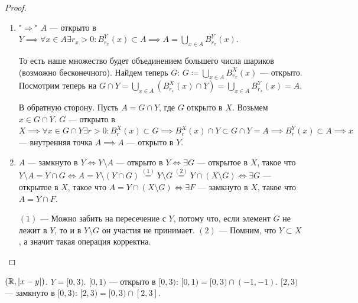 \begin{proof}
     \slashn
     \begin{enumerate}
         \item "$\Rightarrow$" $A$ --- открыто в  $Y \implies \forall x \in A \exists r_x > 0 \!: B_{r_x}^Y(x) \subset A \implies A = \bigcup\limits_{x \in A}B_{r_x}^Y(x)$.

             То есть наше множество будет объединением большего числа шариков (возможно бесконечного). Найдем теперь  $G$:  $G \coloneqq \bigcup\limits_{x \in A} B_{r_x}^X(x)$ --- открыто. Посмотрим теперь на  $G \cap Y = \bigcup\limits_{x \in A}(B_{r_x}^X(x) \cap Y) = \bigcup\limits_{x \in A}B_{r_x}^Y(x) = A$.

         В обратную сторону. Пусть $A = G \cap Y$, где  $G$ открыто в  $X$. Возьмем  $x \in G \cap Y$.  $G$ --- открыто в  $X \implies \forall x \in G \cap Y \exists r > 0\!: B_r^X(x) \subset G \implies B_r^X(x) \cap Y \subset G \cap Y = A \implies B_r^Y(x) \subset A \implies x$ --- внутренняя точка $A \implies A$ --- открыто в  $Y$. 

         \item $A$ --- замкнуто в $Y \iff Y \setminus A$ --- открыто в  $Y \iff \exists G$ --- открытое в  $X$, такое что  $Y \setminus A = Y \cap G \iff A = Y \setminus (Y \cap G) \overset{(1)}{=} Y \setminus G \overset{(2)}{=} Y \cap (X \setminus G) \iff \exists G$ --- открытое в  $X$, такое что  $A = Y \cap (X \setminus G) \iff \exists F$ --- замкнуто в  $X$, такое что  $A = Y \cap F$.

             $(1)$ --- Можно забить на пересечение с  $Y$, потому что, если элемент  $G$ не лежит в $Y$, то и в $Y \setminus G$ он участия не принимает.  $(2)$ --- Помним, что  $Y \subset X$, а значит такая операция корректна.
     \end{enumerate}
\end{proof}
\begin{example}
     $(\mathbb{R}, |x-y|)$.  $Y = [0, 3)$.  $[0, 1)$ --- открыто в  $[0, 3)$:  $[0, 1) = [0, 3) \cap (-1, -1)$.  $[2, 3)$ --- замкнуто в  $[0, 3)$:  $[2, 3) = [0, 3) \cap [2, 3]$.
\end{example}
 
